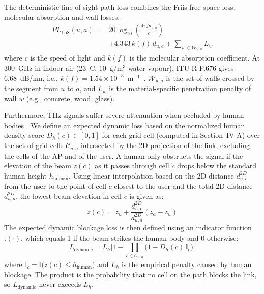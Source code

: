 \documentclass[conference]{IEEEtran}
\begin{document}
	The deterministic line-of-sight path loss combines the Friis free-space loss, molecular absorption \cite{b1,b2} and wall losses:
	\begin{equation}
		\begin{split}
			PL_{\text{LoS}}(u,a) = {} & 20\log_{10}\!\left(\frac{4\pi f d_{u,a}}{c}\right) \\
			& + 4.343\, k(f)\, d_{u,a} + \sum_{w \in \mathcal{W}_{u,a}} L_{w}
		\end{split}
		\label{eq:total_pl}
	\end{equation}
	where $c$ is the speed of light and $k(f)$ is the molecular absorption coefficient. At 300~GHz in indoor air (23~\textdegree C, 10~g/m$^3$ water vapour), ITU-R P.676 gives 6.68~dB/km, i.e., $k(f) = 1.54 \times 10^{-3}$~m$^{-1}$~\cite{itu676}. $\mathcal{W}_{u,a}$ is the set of walls crossed by the segment from $u$ to $a$, and $L_w$ is the material-specific penetration penalty of wall $w$ (e.g., concrete, wood, glass).

	Furthermore, THz signals suffer severe attenuation when occluded by human bodies \cite{b6}. We define an expected dynamic loss based on the normalized human density score $D_h(c) \in [0,1]$ for each grid cell (computed in Section~IV-A) over the set of grid cells $\mathcal{C}_{u,a}$ intersected by the 2D projection of the link, excluding the cells of the AP and of the user. A human only obstructs the signal if the elevation of the beam $z(c)$ as it passes through cell $c$ drops below
	the standard human height $h_{\text{human}}$.
	Using linear interpolation based on the 2D distance $d_{u,c}^{2D}$ from the user to the point of cell $c$ closest to the user and the total 2D distance $d_{u,a}^{2D}$, the lowest beam elevation in cell $c$ is given as:
	\begin{equation}
		z(c) = z_u + \frac{d_{u,c}^{2D}}{d_{u,a}^{2D}} (z_a - z_u)
		\label{eq:beam_height}
	\end{equation}
	The expected dynamic blockage loss is then defined using an indicator function $\mathbb{I}(\cdot)$, which equals 1 if the beam strikes the human body and 0 otherwise:
	\begin{equation}
		L_{\text{dynamic}} = L_{h} \Big[1 - \prod_{c \in \mathcal{C}_{u,a}} \big(1 - D_h(c)\,\mathbb{I}_c\big)\Big]
		\label{eq:dynamic_loss}
	\end{equation}
	where $\mathbb{I}_c = \mathbb{I}\big(z(c) \le h_{\text{human}}\big)$ and $L_{h}$ is the empirical penalty caused by human blockage. The product is the probability that no cell on the path blocks the link, so $L_{\text{dynamic}}$ never exceeds $L_h$.
\end{document}
